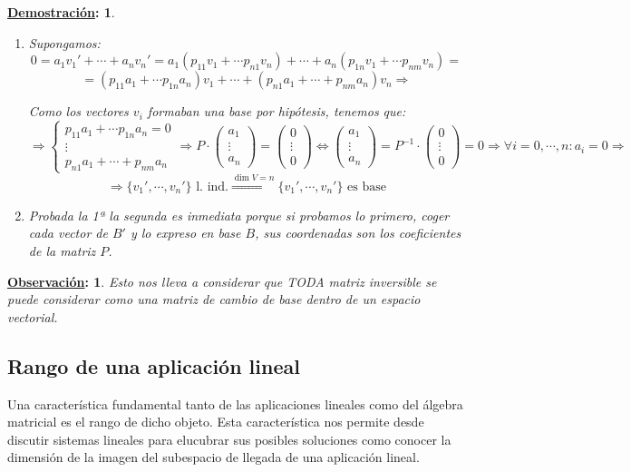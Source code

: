 \documentclass[10pt,a4paper,openright]{book}
\theoremstyle{break}
\newtheorem*{demo}{\underline{Demostración}:}
\newtheorem*{obs}{\underline{Observación}:}
\begin{document}
\begin{demo}
\begin{enumerate}
\item Supongamos:
$$0=a_1v_1'+\cdots+ a_nv_n'=a_1(p_{11}v_1+\cdots p_{n1}v_n)+\cdots +a_n(p_{1n}v_1+\cdots p_{nm}v_n)=$$
$$=(p_{11}a_1+\cdots p_{1n}a_n)v_1+\cdots +(p_{n1}a_1+\cdots +p_{nm}a_n)v_n\Rightarrow $$

Como los vectores $v_i$ formaban una base por hipótesis, tenemos que:
$$\Rightarrow 
\begin{cases}
p_{11}a_1+\cdots p_{1n}a_n=0 \\
\vdots \\
p_{n1}a_1+\cdots +p_{nm}a_n
\end{cases}\Rightarrow P\cdot \begin{pmatrix} a_1 \\ \vdots \\ a_n\end{pmatrix}= \begin{pmatrix} 0 \\ \vdots \\ 0\end{pmatrix}\Leftrightarrow   \begin{pmatrix} a_1 \\ \vdots \\ a_n\end{pmatrix}= P^{-1}\cdot \begin{pmatrix} 0 \\ \vdots \\ 0\end{pmatrix}=0\Rightarrow \forall i=0,\cdots, n: a_i=0\Rightarrow $$
$$\Rightarrow \{v_1', \cdots, v_n'\}\mbox{ l. ind.}\stackrel{\dim V=n}{\Rightarrow} \{v_1', \cdots, v_n'\}\mbox{ es base}
$$

\item Probada la 1ª la segunda es inmediata porque si probamos lo primero, coger cada vector de $B'$ y lo expreso en base $B$, sus coordenadas son los coeficientes de la matriz $P$.
\end{enumerate}
\end{demo}

\begin{obs}
Esto nos lleva a considerar que TODA matriz inversible se puede considerar como una matriz de cambio de base dentro de un espacio vectorial.
\end{obs}

\subsection{Rango de una aplicación lineal}
Una característica fundamental tanto de las aplicaciones lineales como del álgebra matricial es el rango de dicho objeto. Esta característica nos permite desde discutir sistemas lineales para elucubrar sus posibles soluciones como conocer la dimensión de la imagen del subespacio de llegada de una aplicación lineal.
\end{document}
